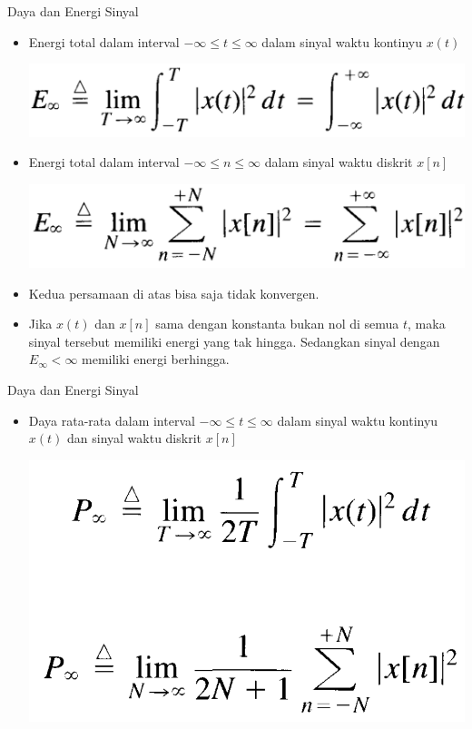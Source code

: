 \documentclass[pdflatex,compress,mathserif]{beamer}
\begin{document}
\begin{frame}{Daya dan Energi Sinyal}
	\begin{itemize}
		\item Energi total dalam interval $ -\infty \leq t \leq \infty $ dalam sinyal waktu kontinyu $ x(t) $
		\begin{center}
			\includegraphics[width=0.5\linewidth]{img/img14}
		\end{center}
		
		\item Energi total dalam interval $ -\infty \leq n \leq \infty $ dalam sinyal waktu diskrit $ x[n] $
		\begin{center}
			\includegraphics[width=0.5\linewidth]{img/img15}
		\end{center}
		
		\item Kedua persamaan di atas bisa saja tidak konvergen.
		\item Jika $ x(t) $ dan $ x[n] $ sama dengan konstanta bukan nol di semua $ t $, maka sinyal tersebut memiliki energi yang tak hingga. Sedangkan sinyal dengan $ E_{\infty} < \infty $ memiliki energi berhingga.
	\end{itemize}
\end{frame}

\begin{frame}{Daya dan Energi Sinyal}
	\begin{itemize}
		\item Daya rata-rata dalam interval $ -\infty \leq t \leq \infty $ dalam sinyal waktu kontinyu $ x(t) $
		dan sinyal waktu diskrit $ x[n] $
		\begin{center}
			\includegraphics[width=0.5\linewidth]{img/img16}
		\end{center}
		
	\end{itemize}
\end{frame}
\end{document}
